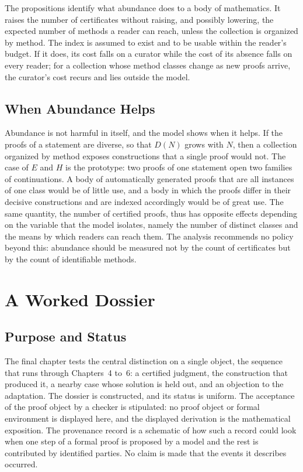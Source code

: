 \documentclass[11pt]{book}
\theoremstyle{definition}
\theoremstyle{remark}
\begin{document}
The propositions identify what abundance does to a body of mathematics. It raises the number of certificates without raising, and possibly lowering, the expected number of methods a reader can reach, unless the collection is organized by method. The index is assumed to exist and to be usable within the reader's budget. If it does, its cost falls on a curator while the cost of its absence falls on every reader; for a collection whose method classes change as new proofs arrive, the curator's cost recurs and lies outside the model.

\section{When Abundance Helps}

Abundance is not harmful in itself, and the model shows when it helps. If the proofs of a statement are diverse, so that $D(N)$ grows with $N$, then a collection organized by method exposes constructions that a single proof would not. The case of $E$ and $H$ is the prototype: two proofs of one statement open two families of continuations. A body of automatically generated proofs that are all instances of one class would be of little use, and a body in which the proofs differ in their decisive constructions and are indexed accordingly would be of great use. The same quantity, the number of certified proofs, thus has opposite effects depending on the variable that the model isolates, namely the number of distinct classes and the means by which readers can reach them. The analysis recommends no policy beyond this: abundance should be measured not by the count of certificates but by the count of identifiable methods.

\chapter{A Worked Dossier}\label{ch:dossier}

\section{Purpose and Status}

The final chapter tests the central distinction on a single object, the sequence that runs through Chapters~4 to~6: a certified judgment, the construction that produced it, a nearby case whose solution is held out, and an objection to the adaptation. The dossier is constructed, and its status is uniform. The acceptance of the proof object by a checker is stipulated: no proof object or formal environment is displayed here, and the displayed derivation is the mathematical exposition. The provenance record is a schematic of how such a record could look when one step of a formal proof is proposed by a model and the rest is contributed by identified parties. No claim is made that the events it describes occurred.
\end{document}

